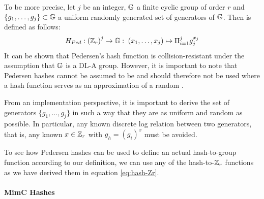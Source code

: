 To be more precise, let $j$ be an integer, $\mathbb{G}$ a finite cyclic group of order $r$ and $\{g_1, \ldots, g_j\} \subset \mathbb{G}$ a uniform randomly generated set of generators of $\mathbb{G}$. Then  is defined as follows:
\begin{equation}
H_{Ped} : \left(\mathbb{Z}_r\right)^j \to \mathbb{G}:\; (x_1,\ldots,x_j)\mapsto \Pi_{i=1}^j g_j^{x_j}
\end{equation}
It can be shown that Pedersen’s  hash  function  is  collision-resistant under the assumption that $\mathbb{G}$ is a DL-A group. However, it is important to note that Pedersen hashes cannot be assumed to be  and should therefore not be used where a hash function serves as an approximation of a random .

From an implementation perspective, it is important to derive the set of generators $\{g_1,\ldots,g_j\}$ in such a way that they are as uniform and random as possible. In particular, any known discrete log relation between two generators, that is, any known $x\in \mathbb{Z}_r$ with $g_h = (g_i)^x$ must be avoided.

To see how Pedersen hashes can be used to define an actual hash-to-group function according to our definition, we can use any of the hash-to-$\mathbb{Z}_r$ functions as we have derived them in equation \ref{eq:hash-Zr}.

\paragraph{MimC Hashes}
\citep{cryptoeprint:2016:492}
